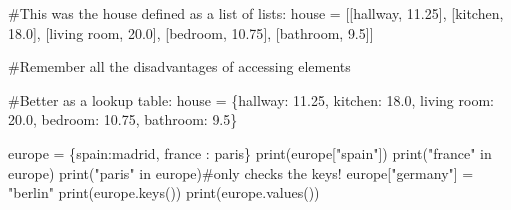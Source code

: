 \documentclass[
  letterpaper,
  DIV=11,
  numbers=noendperiod]{scrreprt}
\newenvironment{Shaded}{\begin{snugshade}}{\end{snugshade}}
\newcommand{\BuiltInTok}[1]{\textcolor[rgb]{0.00,0.23,0.31}{#1}}
\newcommand{\CommentTok}[1]{\textcolor[rgb]{0.37,0.37,0.37}{#1}}
\newcommand{\FloatTok}[1]{\textcolor[rgb]{0.68,0.00,0.00}{#1}}
\newcommand{\KeywordTok}[1]{\textcolor[rgb]{0.00,0.23,0.31}{#1}}
\newcommand{\NormalTok}[1]{\textcolor[rgb]{0.00,0.23,0.31}{#1}}
\newcommand{\OperatorTok}[1]{\textcolor[rgb]{0.37,0.37,0.37}{#1}}
\newcommand{\StringTok}[1]{\textcolor[rgb]{0.13,0.47,0.30}{#1}}
\begin{document}
\begin{Shaded}
\begin{Highlighting}[]
\CommentTok{\#This was the house defined as a list of lists:}
\NormalTok{house }\OperatorTok{=}\NormalTok{ [[}\StringTok{\textquotesingle{}hallway\textquotesingle{}}\NormalTok{, }\FloatTok{11.25}\NormalTok{],}
\NormalTok{ [}\StringTok{\textquotesingle{}kitchen\textquotesingle{}}\NormalTok{, }\FloatTok{18.0}\NormalTok{],}
\NormalTok{ [}\StringTok{\textquotesingle{}living room\textquotesingle{}}\NormalTok{, }\FloatTok{20.0}\NormalTok{],}
\NormalTok{ [}\StringTok{\textquotesingle{}bedroom\textquotesingle{}}\NormalTok{, }\FloatTok{10.75}\NormalTok{],}
\NormalTok{ [}\StringTok{\textquotesingle{}bathroom\textquotesingle{}}\NormalTok{, }\FloatTok{9.5}\NormalTok{]]}

\CommentTok{\#Remember all the disadvantages of accessing elements}

\CommentTok{\#Better as a lookup table:}
\NormalTok{house }\OperatorTok{=}\NormalTok{ \{}\StringTok{\textquotesingle{}hallway\textquotesingle{}}\NormalTok{: }\FloatTok{11.25}\NormalTok{,}
    \StringTok{\textquotesingle{}kitchen\textquotesingle{}}\NormalTok{: }\FloatTok{18.0}\NormalTok{,}
    \StringTok{\textquotesingle{}living room\textquotesingle{}}\NormalTok{: }\FloatTok{20.0}\NormalTok{,}
    \StringTok{\textquotesingle{}bedroom\textquotesingle{}}\NormalTok{: }\FloatTok{10.75}\NormalTok{,}
    \StringTok{\textquotesingle{}bathroom\textquotesingle{}}\NormalTok{: }\FloatTok{9.5}\NormalTok{\}}
\end{Highlighting}
\end{Shaded}

\begin{Shaded}
\begin{Highlighting}[]
\NormalTok{europe }\OperatorTok{=}\NormalTok{ \{}\StringTok{\textquotesingle{}spain\textquotesingle{}}\NormalTok{:}\StringTok{\textquotesingle{}madrid\textquotesingle{}}\NormalTok{, }\StringTok{\textquotesingle{}france\textquotesingle{}}\NormalTok{ : }\StringTok{\textquotesingle{}paris\textquotesingle{}}\NormalTok{\}}
\BuiltInTok{print}\NormalTok{(europe[}\StringTok{"spain"}\NormalTok{])}
\BuiltInTok{print}\NormalTok{(}\StringTok{"france"} \KeywordTok{in}\NormalTok{ europe)}
\BuiltInTok{print}\NormalTok{(}\StringTok{"paris"} \KeywordTok{in}\NormalTok{ europe)}\CommentTok{\#only checks the keys!}
\NormalTok{europe[}\StringTok{"germany"}\NormalTok{] }\OperatorTok{=} \StringTok{"berlin"}
\BuiltInTok{print}\NormalTok{(europe.keys())}
\BuiltInTok{print}\NormalTok{(europe.values())}
\end{Highlighting}
\end{Shaded}
\end{document}
